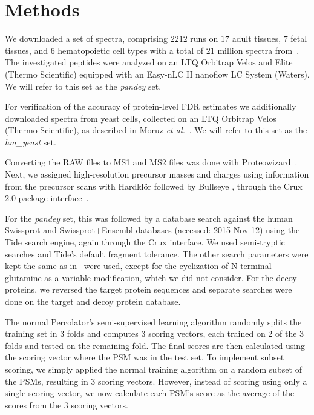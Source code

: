 \documentclass{article}
\begin{document}
\section*{Methods}

We downloaded a set of spectra, comprising $2212$ runs on $17$ adult
tissues, $7$ fetal tissues, and $6$ hematopoietic cell types with a
total of $21$ million spectra from~\cite{kim2014draft}. The
investigated peptides were analyzed on an LTQ Orbitrap Velos and Elite
(Thermo Scientific) equipped with an Easy-nLC II nanoflow LC System
(Waters). We will refer to this set as the {\em pandey} set.

For verification of the accuracy of protein-level FDR estimates we
additionally downloaded spectra from yeast cells, collected on an LTQ
Orbitrap Velos (Thermo Scientific), as described in Moruz {\em et 
al.}~\cite{moruz2013}. We will refer to this set as the {\em
hm\_yeast} set.

Converting the RAW files to MS1 and MS2 files was done with
Proteowizard~\cite{kessner2008}. Next, we assigned high-resolution
precursor masses and charges using information from the precursor
scans with Hardkl\"{o}r \cite{hoopmann2007} followed by Bullseye
\cite{hsieh2009}, through the Crux 2.0 package
interface~\cite{mcilwain2014}. 

For the {\em pandey} set, this was followed by a database search
against the human Swissprot and Swissprot+Ensembl databases (accessed:
2015 Nov 12) using the Tide search engine, again through the Crux
interface. We used semi-tryptic searches and Tide's default fragment
tolerance. The other search parameters were kept the same as
in~\cite{kim2014draft} were used, except for the cyclization of
N-terminal glutamine as a variable modification, which we did not
consider. For the decoy proteins, we reversed the target protein
sequences and separate searches were done on the target and decoy
protein database.

The normal Percolator's semi-supervised learning algorithm randomly
splits the training set in $3$ folds and computes $3$ scoring vectors,
each trained on $2$ of the $3$ folds and tested on the remaining
fold. The final scores are then calculated using the scoring vector
where the PSM was in the test set. To implement subset scoring, we
simply applied the normal training algorithm on a random subset of the
PSMs, resulting in $3$ scoring vectors. However, instead
of scoring using only a single scoring vector, we now calculate each
PSM's score as the average of the scores from the $3$ scoring vectors.
\end{document}
